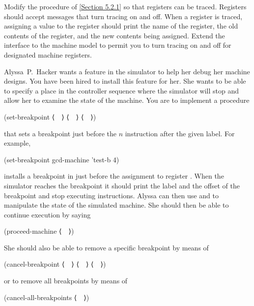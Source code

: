 \begin{exercise}
	\label{Exercise 5.18}
	Modify the  procedure of \cref{Section 5.2.1} so that registers can be traced.
	Registers should accept messages that turn tracing on and off.
	When a register is traced, assigning a value to the register should print the name of the register, the old contents of the register, and the new contents being assigned.
	Extend the interface to the machine model to permit you to turn tracing on and off for designated machine registers.
\end{exercise}



\begin{exercise}
	\label{Exercise 5.19}
	Alyssa P. Hacker wants a  feature in the simulator to help her debug her machine designs.
	You have been hired to install this feature for her.
	She wants to be able to specify a place in the controller sequence where the simulator will stop and allow her to examine the state of the machine.
	You are to implement a procedure
	\begin{scheme}
	  (set-breakpoint ⟨~~⟩ ⟨~~⟩ ⟨~~⟩)
	\end{scheme}
	that sets a breakpoint just before the \( n \) instruction after the given label.
	For example,
	\begin{scheme}
	  (set-breakpoint gcd-machine 'test-b 4)
	\end{scheme}
	installs a breakpoint in  just before the assignment to register \code{a}.
	When the simulator reaches the breakpoint it should print the label and the offset of the breakpoint and stop executing instructions.
	Alyssa can then use  and  to manipulate the state of the simulated machine.
	She should then be able to continue execution by saying
	\begin{scheme}
	  (proceed-machine ⟨~~⟩)
	\end{scheme}
	She should also be able to remove a specific breakpoint by means of
	\begin{scheme}
	  (cancel-breakpoint ⟨~~⟩ ⟨~~⟩ ⟨~~⟩)
	\end{scheme}
	or to remove all breakpoints by means of
	\begin{scheme}
	  (cancel-all-breakpoints ⟨~~⟩)
	\end{scheme}
\end{exercise}
